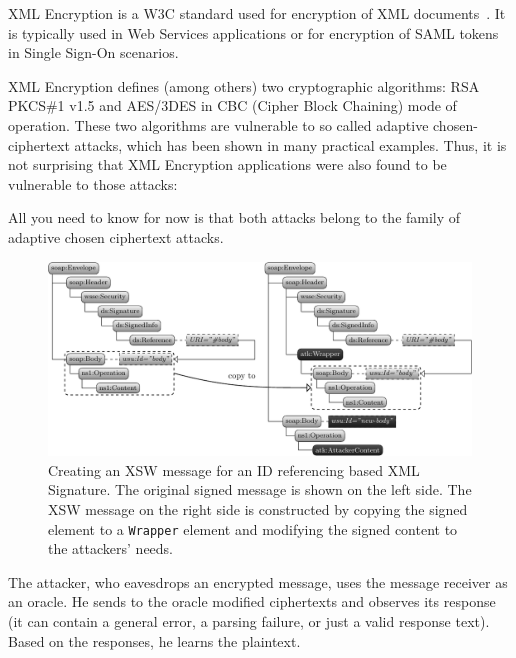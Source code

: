 XML Encryption is a W3C standard used for encryption of XML documents~\cite{Eastlake2013}. It is typically used in Web Services applications or for encryption of SAML tokens in Single Sign-On scenarios.

XML Encryption defines (among others) two cryptographic algorithms: RSA PKCS\#1 v1.5 and AES/3DES in CBC (Cipher Block Chaining) mode of operation. These two algorithms are vulnerable to so called adaptive chosen-ciphertext attacks, which has been shown in many practical examples. Thus, it is not surprising that XML Encryption applications were also found to be vulnerable to those attacks:


    
    

All you need to know for now is that both attacks belong to the family of adaptive chosen ciphertext attacks.

\begin{figure}[ht]
    \begin{center}
        \includegraphics[width=\linewidth]{img/xsw_id}
    \end{center}
    \caption{Creating an XSW message for an ID referencing based XML Signature. 
The original signed message is shown on the left side.
The XSW message on the right side is constructed by copying the signed element to a \texttt{Wrapper} element and modifying the signed content to the attackers' needs.}
    \label{fig:xsw_id}
\end{figure}

The attacker, who eavesdrops an encrypted message, uses the message receiver as an oracle. He sends to the oracle modified ciphertexts and observes its response (it can contain a general error, a parsing failure, or just a valid response text). Based on the responses, he learns the plaintext.